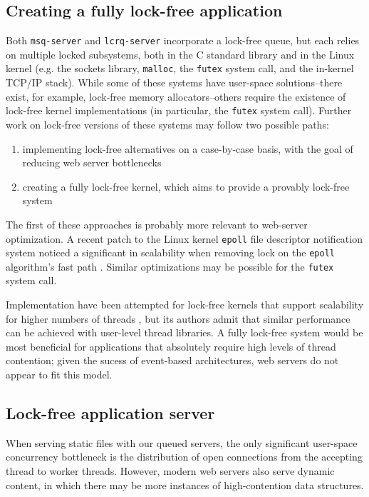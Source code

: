 \documentclass[twoside,10pt]{article}
\begin{document}
\begin{multicols}{2}
\subsection{Creating a fully lock-free application}

Both \verb+msq-server+ and \verb+lcrq-server+ incorporate a lock-free
queue, but each relies on multiple locked subsystems, both in the C
standard library and in the Linux kernel (e.g. the sockets library,
\verb+malloc+, the \verb+futex+ system call, and the in-kernel TCP/IP
stack). While some of these systems have user-space solutions\---there
exist, for example, lock-free memory allocators\---others require the
existence of lock-free kernel implementations (in particular, the
\verb+futex+ system call). Further work on lock-free versions of these
systems may follow two possible paths:
\begin{enumerate}
\item implementing lock-free alternatives on a case-by-case basis,
  with the goal of reducing web server bottlenecks 
\item creating a fully lock-free kernel, which aims to provide a
  provably lock-free system
\end{enumerate}

The first of these approaches is probably more relevant to web-server
optimization. A recent patch to the Linux kernel \verb+epoll+ file
descriptor notification system noticed a significant in scalability
when removing lock on the \verb+epoll+ algorithm's fast path
\cite{lockfree-epoll}. Similar optimizations may be possible for the
\verb+futex+ system call.

Implementation have been attempted for lock-free kernels that support
scalability for higher numbers of threads \cite{massalin1992lock}, but
its authors admit that similar performance can be achieved with
user-level thread libraries. A fully lock-free system would be most
beneficial for applications that absolutely require high levels of
thread contention; given the sucess of event-based architectures, web
servers do not appear to fit this model.

\subsection{Lock-free application server}

When serving static files with our queued servers, the only
significant user-space concurrency bottleneck is the distribution of
open connections from the accepting thread to worker threads. However,
modern web servers also serve dynamic content, in which there may be
more instances of high-contention data structures.


\end{multicols}
\end{document}

